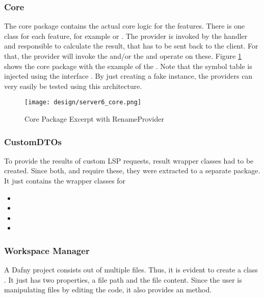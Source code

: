 \subsubsection {Core}
The core package contains the actual core logic for the features.
There is one class for each feature, for example  or .
The provider is invoked by the handler and responsible to calculate the result, that has to be sent back to the client.
For that, the provider will invoke the  and/or the  and operate on these.
Figure \ref{fig:server_core} shows the core package with the example of the .
Note that the symbol table is injected using the interface .
By just creating a fake instance, the providers can very easily be tested using this architecture.


\begin{figure}[H]
    \centering
    \texttt{[image: design/server6\_core.png]}
    \caption{Core Package Excerpt with RenameProvider}
    \label{fig:server_core}
\end{figure}

\subsubsection{CustomDTOs}
To provide the results of custom LSP requests, result wrapper classes had to be created.
Since both,  and  require these, they were extracted to a separate package.
It just contains the wrapper classes for
\begin{itemize}
    \item {}
    \item {}
    \item {}
    \item {}
\end{itemize}

\subsubsection{Workspace Manager}
A Dafny project consists out of multiple  files.
Thus, it is evident to create a class .
It just has two properties, a file path and the file content.
Since the user is manipulating files by editing the code, it also provides an  method.\\

